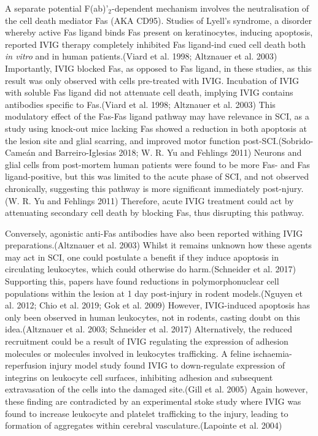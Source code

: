 \documentclass[9pt,lineno]{elife}
\begin{document}
\begin{landscape}
\begin{landscape}
A separate potential F(ab)'\(_2\)-dependent mechanism involves the neutralisation of the cell death mediator Fas (AKA CD95).
Studies of Lyell's syndrome, a disorder whereby active Fas ligand binds Fas present on keratinocytes, inducing apoptosis, reported IVIG therapy completely inhibited Fas ligand-ind cued cell death both \emph{in vitro} and in human patients.(Viard et al. 1998; Altznauer et al. 2003) Importantly, IVIG blocked Fas, as opposed to Fas ligand, in these studies, as this result was only observed with cells pre-treated with IVIG. Incubation of IVIG with soluble Fas ligand did not attenuate cell death, implying IVIG contains antibodies specific to Fas.(Viard et al. 1998; Altznauer et al. 2003) This modulatory effect of the Fas-Fas ligand pathway may have relevance in SCI, as a study using knock-out mice lacking Fas showed a reduction in both apoptosis at the lesion site and glial scarring, and improved motor function post-SCI.(Sobrido-Cameán and Barreiro-Iglesias 2018; W. R. Yu and Fehlings 2011) Neurons and glial cells from post-mortem human patients were found to be more Fas- and Fas ligand-positive, but this was limited to the acute phase of SCI, and not observed chronically, suggesting this pathway is more significant immediately post-njury.(W. R. Yu and Fehlings 2011) Therefore, acute IVIG treatment could act by attenuating secondary cell death by blocking Fas, thus disrupting this pathway.

Conversely, agonistic anti-Fas antibodies have also been reported withing IVIG preparations.(Altznauer et al. 2003) Whilst it remains unknown how these agents may act in SCI, one could postulate a benefit if they induce apoptosis in circulating leukocytes, which could otherwise do harm.(Schneider et al. 2017) Supporting this, papers have found reductions in polymorphonuclear cell populations within the lesion at 1 day post-injury in rodent models.(Nguyen et al. 2012; Chio et al. 2019; Gok et al. 2009) However, IVIG-induced apoptosis has only been observed in human leukocytes, not in rodents, casting doubt on this idea.(Altznauer et al. 2003; Schneider et al. 2017) Alternatively, the reduced recruitment could be a result of IVIG regulating the expression of adhesion molecules or molecules involved in leukocytes trafficking.
A feline ischaemia-reperfusion injury model study found IVIG to down-regulate expression of integrins on leukocyte cell surfaces, inhibiting adhesion and subsequent extravasation of the cells into the damaged site.(Gill et al. 2005) Again however, these finding are contradicted by an experimental stoke study where IVIG was found to increase leukocyte and platelet trafficking to the injury, leading to formation of aggregates within cerebral vasculature.(Lapointe et al. 2004)


\end{landscape}
\end{landscape}
\end{document}
